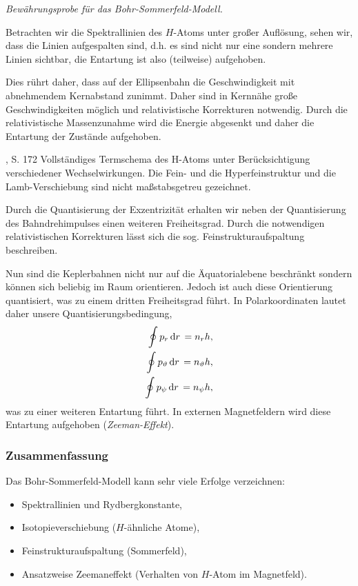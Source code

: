 \textit{Bewährungsprobe für das Bohr-Sommerfeld-Modell.}

Betrachten wir die Spektrallinien des $H$-Atoms unter großer Auflösung,
sehen wir, dass die Linien aufgespalten sind, d.h. es sind nicht nur eine
sondern mehrere Linien sichtbar, die Entartung ist also (teilweise) aufgehoben.

Dies rührt daher, dass auf der Ellipsenbahn die Geschwindigkeit mit abnehmendem
Kernabstand zunimmt. Daher sind in Kernnähe große Geschwindigkeiten möglich
und relativistische Korrekturen notwendig.  Durch die relativistische
Massenzunahme wird die Energie abgesenkt und daher die Entartung der Zustände
aufgehoben.

%
	{\DemtroederThree, S. 172}%
	{Vollständiges Termschema des H-Atoms unter Berücksichtigung verschiedener 
	Wechselwirkungen. Die Fein- und die Hyperfeinstruktur und die
	Lamb-Verschiebung sind nicht maßstabsgetreu gezeichnet.}

Durch die Quantisierung der Exzentrizität erhalten wir neben der Quantisierung
des Bahndrehimpulses einen weiteren Freiheitsgrad. Durch die notwendigen
relativistischen Korrekturen lässt sich die sog. Feinstrukturaufspaltung
beschreiben.

Nun sind die Keplerbahnen nicht nur auf die Äquatorialebene beschränkt sondern
können sich beliebig im Raum orientieren. Jedoch ist auch diese Orientierung
quantisiert, was zu einem dritten Freiheitsgrad führt. In Polarkoordinaten
lautet daher unsere Quantisierungsbedingung,
\begin{align*}
\oint p_r \,\mathrm{d} r\, = n_r h,\\
\oint p_\vartheta \,\mathrm{d} r\, = n_\vartheta h,\\
\oint p_\psi \,\mathrm{d} r\, = n_\psi h,
\end{align*}
was zu einer weiteren Entartung führt. In externen Magnetfeldern wird diese
Entartung aufgehoben (\emph{Zeeman-Effekt}).

\subsubsection{Zusammenfassung}

Das Bohr-Sommerfeld-Modell kann sehr viele Erfolge verzeichnen:
\begin{itemize}
  \item Spektrallinien und Rydbergkonstante,
  \item Isotopieverschiebung ($H$-ähnliche Atome),
  \item Feinstrukturaufspaltung (Sommerfeld),
  \item Ansatzweise Zeemaneffekt (Verhalten von $H$-Atom im Magnetfeld).
\end{itemize}


